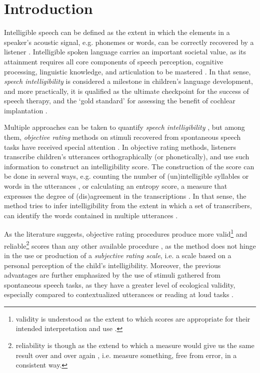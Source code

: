 \section{Introduction} \label{S:introduction}

Intelligible speech can be defined as the extent in which the elements in a speaker's acoustic signal, e.g. phonemes or words, can be correctly recovered by a listener \cite{Freeman_et_al_2017, Kent_et_al_1989, vanHeuven_2008, Whitehill_et_al_2004}. Intelligible spoken language carries an important societal value, as its attainment requires all core components of speech perception, cognitive processing, linguistic knowledge, and articulation to be mastered \cite{Freeman_et_al_2017}. In that sense, \textit{speech intelligibility} is considered a milestone in children's language development, and more practically, it is qualified as the ultimate checkpoint for the success of speech therapy, and the `gold standard' for assessing the benefit of cochlear implantation \cite{Chin_et_al_2012}. 

Multiple approaches can be taken to quantify \textit{speech intelligibility} \cite{Boonen_et_al_2020, Boonen_et_al_2021, Flipsen_2006, Hustad_et_al_2020}, but among them, \textit{objective rating} methods on stimuli recovered from spontaneous speech tasks have received special attention \cite{Boonen_et_al_2021, Hustad_et_al_2020}. In objective rating methods, listeners transcribe children's utterances orthographically (or phonetically), and use such information to construct an intelligibility score. The construction of the score can be done in several ways, e.g. counting the number of (un)intelligible syllables or words in the utterances \cite{Flipsen_2006, Lagerberg_et_al_2014}, or calculating an entropy score, a measure that expresses the degree of (dis)agreement in the transcriptions \cite{Boonen_et_al_2021, Shannon_1948}. In that sense, the method tries to infer intelligibility from the extent in which a set of transcribers, can identify the words contained in multiple utterances \cite{Boonen_et_al_2021}. 

As the literature suggests, objective rating procedures produce more valid\footnote{validity is understood as the extent to which scores are appropriate for their intended interpretation and use \cite{Lesterhuis_2018, Trochim_2022}.} and reliable\footnote{reliability is though as the extend to which a measure would give us the same result over and over again \cite{Trochim_2022}, i.e. measure something, free from error, in a consistent way.} scores than any other available procedure \cite{Boonen_et_al_2021, Faes_et_al_2021}, as the method does not hinge in the use or production of a \textit{subjective rating scale}, i.e. a scale based on a personal perception of the child's intelligibility. Moreover, the previous advantages are further emphasized by the use of stimuli gathered from spontaneous speech tasks, as they have a greater level of ecological validity, especially compared to contextualized utterances or reading at loud tasks \cite{Flipsen_2006, Ertmer_2011}.

